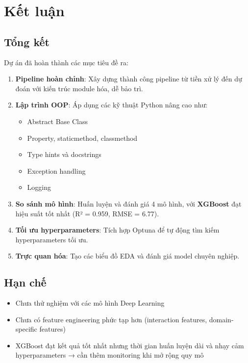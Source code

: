 \documentclass[12pt,a4paper]{article}
\begin{document}
\section{Kết luận}

\subsection{Tổng kết}

Dự án đã hoàn thành các mục tiêu đề ra:

\begin{enumerate}
    \item \textbf{Pipeline hoàn chỉnh}: Xây dựng thành công pipeline từ tiền xử lý đến dự đoán với kiến trúc module hóa, dễ bảo trì.
    
    \item \textbf{Lập trình OOP}: Áp dụng các kỹ thuật Python nâng cao như:
    \begin{itemize}
        \item Abstract Base Class
        \item Property, staticmethod, classmethod
        \item Type hints và docstrings
        \item Exception handling
        \item Logging
    \end{itemize}
    
    \item \textbf{So sánh mô hình}: Huấn luyện và đánh giá 4 mô hình, với \textbf{XGBoost} đạt hiệu suất tốt nhất (R² = 0.959, RMSE = 6.77).
    
    \item \textbf{Tối ưu hyperparameters}: Tích hợp Optuna để tự động tìm kiếm hyperparameters tối ưu.
    
    \item \textbf{Trực quan hóa}: Tạo các biểu đồ EDA và đánh giá model chuyên nghiệp.
\end{enumerate}

\subsection{Hạn chế}

\begin{itemize}
    \item Chưa thử nghiệm với các mô hình Deep Learning
    \item Chưa có feature engineering phức tạp hơn (interaction features, domain-specific features)
    \item XGBoost đạt kết quả tốt nhất nhưng thời gian huấn luyện dài và nhạy cảm hyperparameters → cần thêm monitoring khi mở rộng quy mô
\end{itemize}
\end{document}
